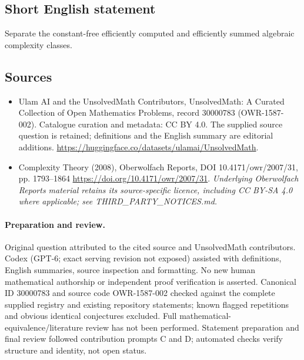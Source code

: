 \documentclass[11pt]{article}
\begin{document}
\subsection{Short English statement}
Separate the constant-free efficiently computed and efficiently summed algebraic complexity classes.
\subsection{Sources}
\begin{itemize}
\item[\hypertarget{source:30000783:1}{S1}] Ulam AI and the UnsolvedMath Contributors, UnsolvedMath: A Curated Collection of Open Mathematics Problems, record 30000783 (OWR-1587-002). Catalogue curation and metadata: CC BY 4.0. The supplied source question is retained; definitions and the English summary are editorial additions.
\url{https://huggingface.co/datasets/ulamai/UnsolvedMath}.
\item[\hypertarget{source:30000783:2}{S2}] Complexity Theory (2008), Oberwolfach Reports, DOI 10.4171/owr/2007/31, pp. 1793--1864
\url{https://doi.org/10.4171/owr/2007/31}.
\textit{Underlying Oberwolfach Reports material retains its source-specific licence, including CC BY-SA 4.0 where applicable; see THIRD\_PARTY\_NOTICES.md.}
\end{itemize}
\paragraph{Preparation and review.}
Original question attributed to the cited source and UnsolvedMath contributors. Codex (GPT-6; exact serving revision not exposed) assisted with definitions, English summaries, source inspection and formatting. No new human mathematical authorship or independent proof verification is asserted. Canonical ID 30000783 and source code OWR-1587-002 checked against the complete supplied registry and existing repository statements; known flagged repetitions and obvious identical conjectures excluded. Full mathematical-equivalence/literature review has not been performed. Statement preparation and final review followed contribution prompts C and D; automated checks verify structure and identity, not open status.
\label{end:30000783}
\end{document}
